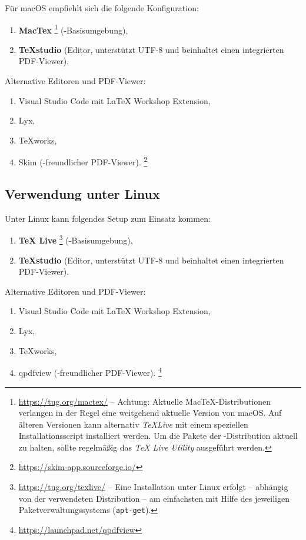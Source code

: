 Für macOS empfiehlt sich die folgende Konfiguration:
%
\begin{enumerate}
\item 
	\textbf{MacTex}%
	\footnote{\url{https://tug.org/mactex/} -- Achtung: Aktuelle
	MacTeX-Distributionen verlangen in der Regel eine weitgehend aktuelle Version
	von macOS. Auf älteren Versionen kann alternativ \emph{TeXLive} mit einem
	speziellen Installationsscript installiert werden. Um die Pakete der
	\latex-Distribution aktuell zu halten, sollte regelmäßig das \emph{TeX Live
	Utility} ausgeführt werden.}
	(\latex-Basisumgebung),
\item \textbf{TeXstudio} (Editor, unterstützt UTF-8 und beinhaltet einen
integrierten PDF-Viewer).
\end{enumerate}
%
Alternative Editoren und PDF-Viewer:
%
\begin{enumerate}
	\item Visual Studio Code mit LaTeX Workshop Extension,%
	\item Lyx,%
	\item TeXworks,%
	\item Skim (\latex-freundlicher PDF-Viewer).%
	\footnote{\url{https://skim-app.sourceforge.io/}}
\end{enumerate}


\subsection{Verwendung unter Linux}

Unter Linux kann folgendes Setup zum Einsatz kommen:
%
\begin{enumerate}
	\item 
	\textbf{TeX Live}%
	\footnote{\url{https://tug.org/texlive/} -- Eine Installation unter Linux
	erfolgt -- abhängig von der verwendeten Distribution -- am einfachsten mit
	Hilfe des jeweiligen Paketverwaltungssystems (\zB \texttt{apt-get}).}
	(\latex-Basisumgebung),
	\item \textbf{TeXstudio} (Editor, unterstützt UTF-8 und beinhaltet einen
	integrierten PDF-Viewer).
\end{enumerate}
%
Alternative Editoren und PDF-Viewer:
%
\begin{enumerate}
	\item Visual Studio Code mit LaTeX Workshop Extension,%
	\item Lyx,%
	\item TeXworks,%
	\item qpdfview (\latex-freundlicher PDF-Viewer).%
	\footnote{\url{https://launchpad.net/qpdfview}}
\end{enumerate}

